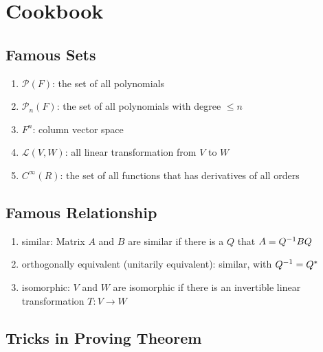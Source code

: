 \section{Cookbook}

\subsection{Famous Sets}

\begin{enumerate}
    \item $\mathcal{P}(F)$: the set of all polynomials
    \item $\mathcal{P}_n (F)$: the set of all polynomials with degree $\leq n$
    \item $F^n$: column vector space
    \item $\mathcal{L}(V,W)$: all linear transformation from $V$ to $W$
    \item $C^\infty (R)$: the set of all functions that has derivatives of all orders
\end{enumerate}

\subsection{Famous Relationship}
\begin{enumerate}
    \item similar: Matrix $A$ and $B$ are similar if there is a $Q$ that $A = {Q}^{-1} B Q$
    \item orthogonally equivalent (unitarily equivalent): similar, with ${Q}^{-1} = Q^*$
    \item isomorphic: $V$ and $W$ are isomorphic if there is an invertible linear transformation $T:V \rightarrow W$
\end{enumerate}


\subsection{Tricks in Proving Theorem}

